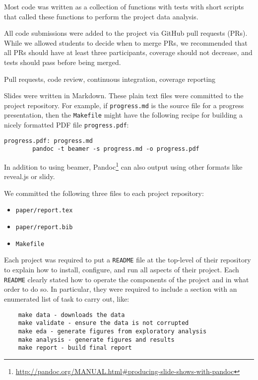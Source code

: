 Most code was written as a collection of functions with tests with short
scripts that called these functions to perform the project data analysis.

All code submissions were added to the project via GitHub pull requests (PRs).
While we allowed students to decide when to merge PRs, we recommended that
all PRs should have at least three participants, coverage should not decrease,
and tests should pass before being merged.

Pull requests, code review, continuous integration, coverage reporting

Slides were written in Markdown.
These plain text files were committed to the project repository.
For example, if \texttt{progress.md} is the source file for a progress presentation,
then the \texttt{Makefile} might have the following recipe for building a nicely
formatted PDF file \texttt{progress.pdf}:
\begin{verbatim}
progress.pdf: progress.md
        pandoc -t beamer -s progress.md -o progress.pdf
\end{verbatim}

In addition to using beamer,
Pandoc\footnote{\url{http://pandoc.org/MANUAL.html\#producing-slide-shows-with-pandoc}}
can also output using other formats like reveal.js or slidy.

We committed the following three files to each project repository:
\begin{itemize}
\item \texttt{paper/report.tex}
\item \texttt{paper/report.bib}
\item \texttt{Makefile}
\end{itemize}


Each project was required to put a \texttt{README} file at the top-level
of their repository to explain how to install, configure,
and run all aspects of their project.
Each \texttt{README} clearly stated  how to operate the
components of the project and in what order to do so.
In particular, they were required to include a section with
an enumerated list of task to carry out, like:
\begin{verbatim}
    make data - downloads the data 
    make validate - ensure the data is not corrupted
    make eda - generate figures from exploratory analysis
    make analysis - generate figures and results
    make report - build final report
\end{verbatim}

